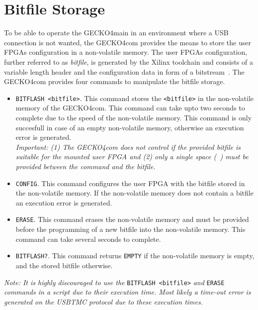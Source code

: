 \section{Bitfile Storage}
To be able to operate the {\sc GECKO4main} in an environment where a USB
connection is not wanted, the {\sc GECKO4com} provides the means to store the
user FPGAs configuration in a non-volatile memory. The user FPGAs configuration,
further referred to as \emph{bitfile}, is generated by the Xilinx toolchain and
consists of a variable length header and the configuration data in form of a
bitstream~\cite{FPGAFAQ_0026}. The {\sc GECKO4com} provides four commands to
manipulate the bitfile storage.
\begin{itemize}
\item \verb*+BITFLASH <bitfile>+. This command stores the \verb+<bitfile>+ in
the non-volatile memory of the {\sc GECKO4com}. This command can take upto two
seconds to complete due to the speed of the non-volatile memory. This command
is only succesfull in case of an empty non-volatile memory, otherwise an
execution error is generated.\\
\textit{Important: (1) The {\sc GECKO4com} does not control if the provided
bitfile is suitable for the mounted user FPGA and
(2) only a single space (}\verb*+ +\textit{)  must be provided between the command and
the bitfile.}
\item \verb+CONFIG+. This command configures the user FPGA with the bitfile
stored in the non-volatile memory. If the non-volatile memory does not contain a
bitfile an execution error is generated.
\item \verb+ERASE+. This command erases the non-volatile memory and must be
provided before the programming of a new bitfile into the non-volatile memory.
This command can take several seconds to complete.
\item \verb+BITFLASH?+. This command returns \verb+EMPTY+ if the non-volatile
memory is empty, and the stored bitfile otherwise.
\end{itemize}
\textit{Note: It is highly discouraged to use the }\verb+BITFLASH <bitfile>+
\textit{ and }
\verb+ERASE+ \textit{ commands in a script due to their execution time. Most likely a
time-out error is generated on the USBTMC protocol due to these execution
times. \note}
